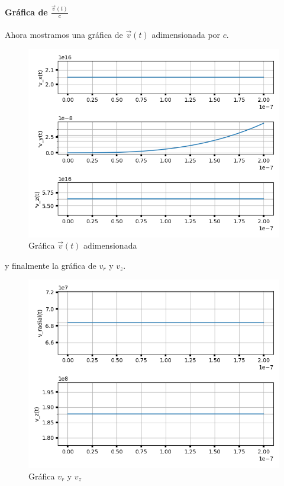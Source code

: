 \newpage 

\paragraph{Gráfica de $\frac{\vec{v}(t)}{c}$}

Ahora mostramos una gráfica de $\vec{v}(t)$ adimensionada por $c$.

\begin{figure}[H]
	\includegraphics[width=\linewidth]{figures/rel_adim_vx_vy_vz.png}
	\caption{Gráfica $\vec{v}(t)$ adimensionada}
	\label{fig:rel_adim_vx_vy_vz}
\end{figure}

y finalmente la gráfica de $v_r$ y $v_z$.

\begin{figure}[H]
	\includegraphics[width=\linewidth]{figures/rel_v_radial_vz.png}
	\caption{Gráfica $v_r$ y $v_z$}
	\label{fig:rel_v_radial_vz}
\end{figure}
